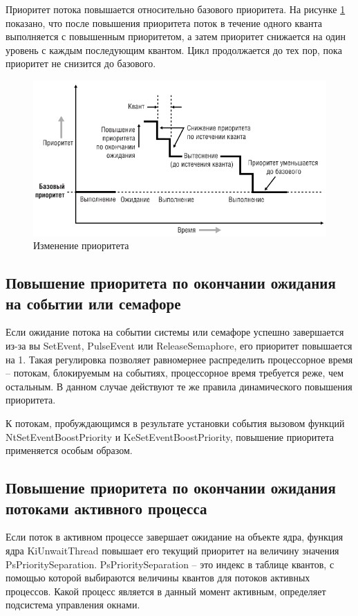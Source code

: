 Приоритет потока повышается относительно базового приоритета. На рисунке \ref{fig:1} показано, что после повышения приоритета поток в течение одного кванта выполняется с повышенным приоритетом, а затем приоритет снижается на один уровень с каждым последующим квантом. Цикл продолжается до тех пор, пока приоритет не снизится до базового.

\begin{figure}
	\centering
	\includegraphics[width=\linewidth]{img/screenshot001}
	\caption{Изменение приоритета}
	\label{fig:1}
\end{figure}

\subsection{Повышение приоритета по окончании ожидания на событии или семафоре}

Если ожидание потока на событии системы или семафоре успешно завершается из-за вы SetEvent, PulseEvent или ReleaseSemaphore, его приоритет повышается на 1. Такая регулировка позволяет равномернее распределить процессорное время -- потокам, блокируемым на событиях, процессорное время требуется реже, чем остальным. В данном случае действуют те же правила динамического повышения приоритета.

К потокам, пробуждающимся в результате установки события вызовом функций NtSetEventBoostPriority и KeSetEventBoostPriority, повышение приоритета применяется особым образом.

\subsection{Повышение приоритета по окончании ожидания потоками активного процесса}

Если поток в активном процессе завершает ожидание на объекте ядра, функция ядра KiUnwaitThread повышает его текущий приоритет на величину значения PsPrioritySeparation. PsPrioritySeparation -- это индекс в таблице квантов, с помощью которой выбираются величины квантов для потоков активных процессов. Какой процесс является в данный момент активным, определяет подсистема управления окнами.

